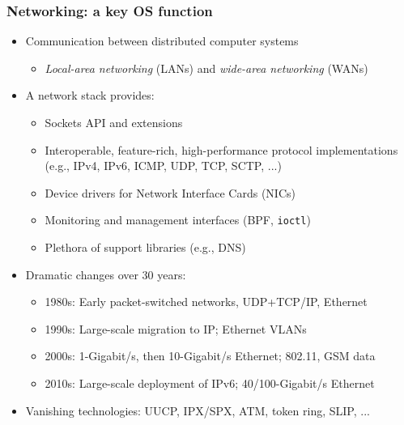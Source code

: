 \begin{frame}
  \frametitle{Networking: a key OS function}

  \pause
  \medskip

  \begin{itemize}
    \item Communication between distributed computer systems
    \begin{itemize}
      \item \textit{Local-area networking} (LANs) and
	\textit{wide-area networking} (WANs)
    \end{itemize}

    \pause
    \medskip

    \item A network stack provides:
    \begin{itemize}
      \item Sockets API and extensions
      \item Interoperable, feature-rich, high-performance protocol
	implementations (e.g., IPv4, IPv6, ICMP, UDP, TCP, SCTP, ...)
      \item Device drivers for Network Interface Cards (NICs)
      \item Monitoring and management interfaces (BPF, \texttt{ioctl})
      \item Plethora of support libraries (e.g., DNS)
    \end{itemize}

    \pause
    \medskip

    \item Dramatic changes over 30 years:
    \begin{itemize}
      \item 1980s: Early packet-switched networks, UDP+TCP/IP, Ethernet
      \item 1990s: Large-scale migration to IP; Ethernet VLANs
      \item 2000s: 1-Gigabit/s, then 10-Gigabit/s Ethernet; 802.11, GSM data
      \item 2010s: Large-scale deployment of IPv6; 40/100-Gigabit/s Ethernet
    \end{itemize}

    \medskip
    \pause

    \item Vanishing technologies: UUCP, IPX/SPX, ATM, token ring, SLIP, ...
  \end{itemize}
\end{frame}

